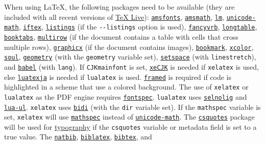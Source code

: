 \documentclass[
]{article}
\begin{document}
When using LaTeX, the following packages need to be available (they are
included with all recent versions of
\href{https://www.tug.org/texlive/}{TeX Live}):
\href{https://ctan.org/pkg/amsfonts}{\texttt{amsfonts}},
\href{https://ctan.org/pkg/amsmath}{\texttt{amsmath}},
\href{https://ctan.org/pkg/lm}{\texttt{lm}},
\href{https://ctan.org/pkg/unicode-math}{\texttt{unicode-math}},
\href{https://ctan.org/pkg/iftex}{\texttt{iftex}},
\href{https://ctan.org/pkg/listings}{\texttt{listings}} (if the
\texttt{-\/-listings} option is used),
\href{https://ctan.org/pkg/fancyvrb}{\texttt{fancyvrb}},
\href{https://ctan.org/pkg/longtable}{\texttt{longtable}},
\href{https://ctan.org/pkg/booktabs}{\texttt{booktabs}},
\href{https://ctan.org/pkg/multirow}{\texttt{multirow}} (if the document
contains a table with cells that cross multiple rows),
\href{https://ctan.org/pkg/graphicx}{\texttt{graphicx}} (if the document
contains images),
\href{https://ctan.org/pkg/bookmark}{\texttt{bookmark}},
\href{https://ctan.org/pkg/xcolor}{\texttt{xcolor}},
\href{https://ctan.org/pkg/soul}{\texttt{soul}},
\href{https://ctan.org/pkg/geometry}{\texttt{geometry}} (with the
\texttt{geometry} variable set),
\href{https://ctan.org/pkg/setspace}{\texttt{setspace}} (with
\texttt{linestretch}), and
\href{https://ctan.org/pkg/babel}{\texttt{babel}} (with \texttt{lang}).
If \texttt{CJKmainfont} is set,
\href{https://ctan.org/pkg/xecjk}{\texttt{xeCJK}} is needed if
\texttt{xelatex} is used, else
\href{https://ctan.org/pkg/luatexja}{\texttt{luatexja}} is needed if
\texttt{lualatex} is used.
\href{https://ctan.org/pkg/framed}{\texttt{framed}} is required if code
is highlighted in a scheme that use a colored background. The use of
\texttt{xelatex} or \texttt{lualatex} as the PDF engine requires
\href{https://ctan.org/pkg/fontspec}{\texttt{fontspec}}.
\texttt{lualatex} uses
\href{https://ctan.org/pkg/selnolig}{\texttt{selnolig}} and
\href{https://ctan.org/pkg/lua-ul}{\texttt{lua-ul}}. \texttt{xelatex}
uses \href{https://ctan.org/pkg/bidi}{\texttt{bidi}} (with the
\texttt{dir} variable set). If the \texttt{mathspec} variable is set,
\texttt{xelatex} will use
\href{https://ctan.org/pkg/mathspec}{\texttt{mathspec}} instead of
\href{https://ctan.org/pkg/unicode-math}{\texttt{unicode-math}}. The
\href{https://ctan.org/pkg/csquotes}{\texttt{csquotes}} package will be
used for \protect\hyperlink{typography}{typography} if the
\texttt{csquotes} variable or metadata field is set to a true value. The
\href{https://ctan.org/pkg/natbib}{\texttt{natbib}},
\href{https://ctan.org/pkg/biblatex}{\texttt{biblatex}},
\href{https://ctan.org/pkg/bibtex}{\texttt{bibtex}}, and
\end{document}
